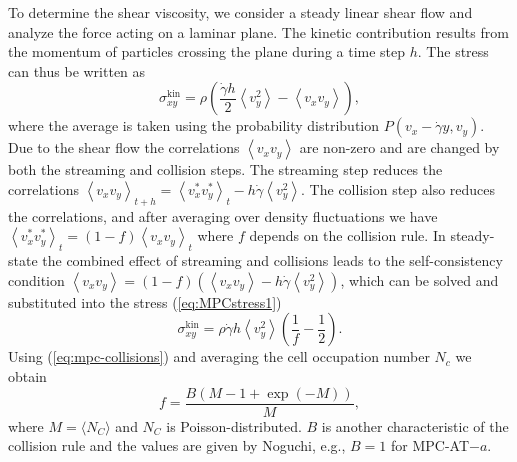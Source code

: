 \documentclass[8.5pt,twoside,twocolumn]{article}
\begin{document}
To determine the shear viscosity, we consider a steady linear shear flow and analyze the force acting on a laminar plane. 
%
The kinetic contribution results from the momentum of particles crossing the plane during a time step $h$. The stress can thus be written as\cite{Kikuchi:2003,Noguchi:2008}
%
\begin{equation}\label{eq:MPCstress1}
\sigma^\text{kin}_{xy} = \rho \left( \frac{\dot{\gamma} h}{2} \left\langle v_y^2 \right\rangle - \left\langle v_x v_y \right\rangle \right) ,
\end{equation}
%
where the average is taken using the probability distribution $P(v_x-\dot{\gamma}y,v_y)$. Due to the shear flow the correlations $\left\langle v_xv_y \right\rangle$ are non-zero and are changed by both the streaming and collision steps.
%
The streaming step reduces the correlations $\left\langle v_xv_y \right\rangle_{t+h} = \left\langle v_x^*v_y^* \right\rangle_t - h \dot{\gamma} \left\langle v_y^2 \right\rangle$.
%
The collision step also reduces the correlations, and after averaging over density fluctuations we have $\left\langle v_x^*v_y^* \right\rangle_t = (1-f) \left\langle v_xv_y \right\rangle_t$ where $f$ depends on the collision rule. In steady-state the combined effect of streaming and collisions leads to the self-consistency condition $\left\langle v_xv_y \right\rangle = (1-f) \left( \left\langle v_xv_y \right\rangle - h \dot{\gamma} \left\langle v_y^2 \right\rangle \right)$, which can be solved and substituted into the stress (\ref{eq:MPCstress1})
%
\begin{equation}
\sigma^\text{kin}_{xy} = \rho \dot{\gamma} h \left\langle v_y^2 \right\rangle \left( \frac{1}{f} -\frac{1}{2} \right) .
\end{equation}
%
Using (\ref{eq:mpc-collisions}) and averaging the cell occupation number $N_c$ we obtain
%
\begin{equation}
f = \frac{B\left(M-1+\exp(-M)\right)}{M} ,
\end{equation}
%
where $M=\langle N_C \rangle$ and $N_C$ is Poisson-distributed. $B$ is another characteristic of the collision rule and the values are given by Noguchi\cite{Noguchi:2008}, e.g., $B=1$ for MPC-AT$-a$.
\end{document}
